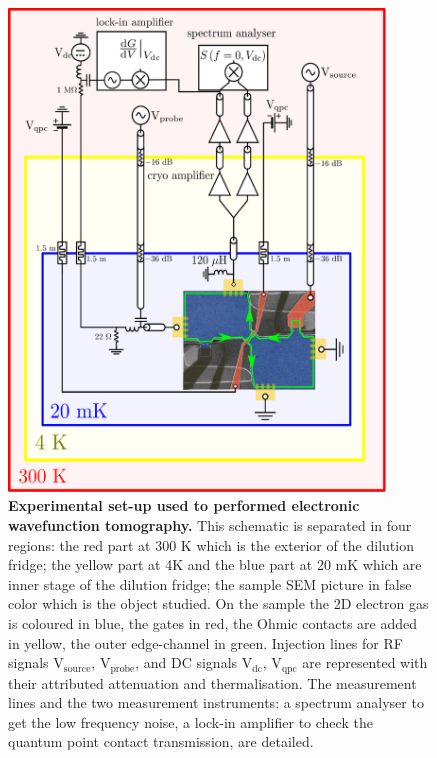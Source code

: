 \begin{figure}[hpbt]
	\centering
	\includegraphics[width = 10cm]{./chap1/set-up_bruit_BF_pour_tomo.eps}
	\caption{\textbf{Experimental set-up used to performed electronic wavefunction tomography.} This schematic is separated in four regions: the red part at 300 K which is the exterior of the dilution fridge; the yellow part at 4K and the blue part at 20 mK which are inner stage of the dilution fridge; the sample SEM picture in false color which is the object studied. On the sample the 2D electron gas is coloured in blue, the gates in red, the Ohmic contacts are added in yellow, the outer edge-channel in green. Injection lines for RF signals V$_{\mathrm{source}}$, V$_{\mathrm{probe}}$, and DC signals V$_{\mathrm{dc}}$, V$_{\mathrm{qpc}}$ are represented with their attributed attenuation and thermalisation. The measurement lines and the two measurement instruments: a spectrum analyser to get the low frequency noise, a lock-in amplifier to check the quantum point contact transmission, are detailed.}
	\label{fig: le set-up}
\end{figure}

